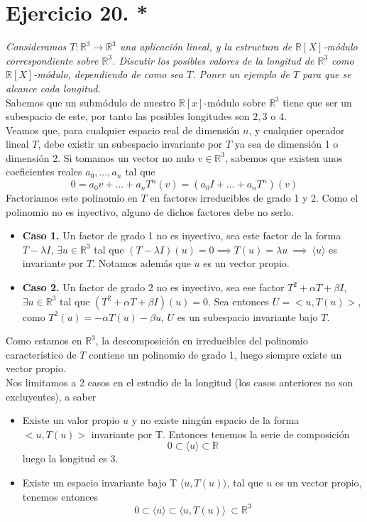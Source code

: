 \section{Ejercicio 20. *} \textit{Consideramos \(T:\mathbb{R}^3 \to
  \mathbb{R}^3\) una aplicación lineal, y la estructura de
  \(\mathbb{R}[X]\)-módulo correspondiente sobre \(\mathbb{R}^3\). Discutir los
  posibles valores de la longitud de \(\mathbb{R}^3\) como
  \(\mathbb{R}[X]\)-módulo, dependiendo de como sea \(T\). Poner un ejemplo de
  \(T\) para que se alcance cada longitud.}\\

Sabemos que un submódulo de nuestro \(\mathbb{R}[x]\)-módulo sobre
\(\mathbb{R}^3\) tiene  que ser un subespacio de este, por tanto las posibles
longitudes son \(2,3\) o \(4\).\\

Veamos que, para cualquier espacio real de dimensión \(n\), y cualquier operador lineal \(T\), debe existir un subespacio invariante por \(T\) ya sea de dimensión 1 o dimensión 2.
Si tomamos un vector no nulo \(v \in \mathbb{R}^3\), sabemos que existen unos
coeficientes reales \(a_0, \dots, a_n\) tal que
\[
  0 = a_0v + \dots + a_nT^n(v) = (a_0I + \dots + a_nT^n)(v)
\]
Factoriamos este polinomio en \(T\) en factores irreducibles de grado 1 y 2.
Como el polinomio no es inyectivo, alguno de dichos factores debe no serlo.
\begin{itemize}
\item \textbf{Caso 1.} Un factor de grado 1 no es inyectivo, sea este factor de la
  forma \(T - \lambda I\), \(\exists u \in \mathbb{R}^3\) tal que \((T - \lambda
  I)(u) = 0 \implies T(u) = \lambda u \ \implies \ \langle u \rangle\) es
  invariante por \(T\). Notamos además que \(u\) es un vector propio.
\item \textbf{Caso 2.} Un factor de grado 2 no es inyectivo, sea ese factor
  \(T^2 + \alpha T + \beta I\), \(\exists u \in \mathbb{R}^3\) tal que \((T^2 +
  \alpha T + \beta I)(u)= 0\). Sea entonces \(U = <u,T(u)>\), como \(T^2(u) =
  -\alpha T(u) - \beta u \), \(U\) es un subespacio invariante bajo \(T\).
\end{itemize}

Como estamos en \(\mathbb{R}^3\), la descomposición en irreducibles del
polinomio característico de \(T\) contiene un polinomio de grado 1, luego
siempre existe un vector propio.\\

Nos limitamos a 2 casos en el estudio de la longitud (los casos
anteriores no son excluyentes), a saber
\begin{itemize}
\item Existe un valor propio \(u\) y no existe ningún espacio de la forma \(<u, T(u)>\) invariante por T. Entonces tenemos la serie de composición
  \[
    0 \subset \langle u \rangle \subset \mathbb{R}
  \]
  luego la longitud es 3.
\item Existe un espacio invariante bajo T \(\langle u, T(u) \rangle\), tal que \(u\) es
  un vector propio, tenemos entonces
  \[
    0 \subset \langle u \rangle \subset \langle u, T(u) \rangle\ \subset \mathbb{R}^3
  \]
\end{itemize}

